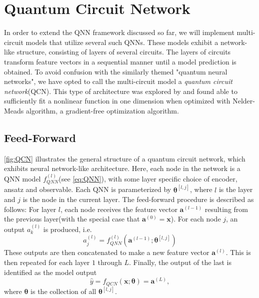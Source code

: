 \section{Quantum Circuit Network}\label{sec:Quantum Circuit Network}
In order to extend the QNN framework discussed so far, we will implement multi-circuit models that utilize several such QNNs. These models exhibit a network-like structure, consisting of layers of several circuits. The layers of circuits transform feature vectors in a sequential manner until a model prediction is obtained. To avoid confusion with the similarly themed "quantum neural networks", we have opted to call the multi-circuit model a \emph{quantum circuit network}(QCN). This type of architecture was explored by \citet{b} and found able to sufficiently fit a nonlinear function in one dimension when optimized with Nelder-Meads algorithm, a gradient-free optimization algorithm.


\subsection{Feed-Forward}\label{sec:FeedForward}
\autoref{fig:QCN} illustrates the general structure of a quantum circuit network, which exhibits neural network-like architecture. Here, each node in the network is a QNN model $f^{(l)}_{QNN}$(see \autoref{eq:QNN}), with some layer specific choice of encoder, ansatz and observable. Each QNN is parameterized by $\boldsymbol{\theta}^{[l,j]}$, where $l$ is the layer and $j$ is the node in the current layer. The feed-forward procedure is described as follows: 
For layer $l$, each node receives the feature vector $\boldsymbol{a}^{(l-1)}$ resulting from the previous layer(with the special case that $\boldsymbol{a}^{(0)} = \boldsymbol{x}$). For each node $j$, an output $a^{(l)}_k$ is produced, i.e.
\begin{equation}
    a^{(l)}_j = f^{(l)}_{QNN}(\boldsymbol{a}^{(l-1)}; \boldsymbol{\theta}^{[l,j]})
\end{equation}
These outputs are then concatenated to make a new feature vector $\boldsymbol{a}^{(l)}$. This is then repeated for each layer $1$ through $L$. Finally, the output of the last is identified as the model output
\begin{equation}\label{eq:QCN}
    \hat{y} = f_{QCN}(\boldsymbol{x}; \boldsymbol{\theta}) = \boldsymbol{a}^{(L)},
\end{equation}
where $\boldsymbol{\theta}$ is the collection of all $\boldsymbol{\theta}^{[l,j]}$.


